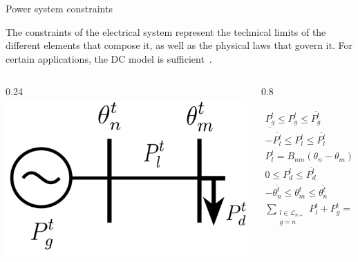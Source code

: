 \documentclass[hyperref={colorlinks,citecolor=blue,linkcolor=blue,urlcolor=blue}]{beamer}
\begin{document}
\begin{frame}{Power system constraints}

The constraints of the electrical system represent the technical limits of the different elements that compose it, as well as the physical laws that govern it. For certain applications, the DC model is sufficient~\cite{8468081}.

\begin{columns}
\begin{column}{0.24\textwidth}
\vspace{3pt}
    \includegraphics[width=1.4\textwidth]{figures/power_dummy_constraint.png}
\end{column}
\begin{column}{0.8\textwidth}  %


\begin{subequations}
\begin{alignat}{2}
    \underline{P_g^t} \leq P_{g}^t \leq \overline{P_g^t} &\quad &\forall \ g \in \mathcal{G}, \label{eq:gen_limits} \\
    -\overline{P_l^t} \leq P_{l}^t \leq \overline{P_l^t} &\quad &\forall \ l \in \mathcal{L}, \label{eq:line_limits} \\
    P_{l}^t = B_{nm}(\theta_n - \theta_{m}) &\quad &\forall \ l = (n, m) \in \mathcal{L}, \label{eq:dc_power_flow} \\
    0 \leq P_{d}^t \leq \overline{P_{d}^t} &\quad &\forall \ d \in \mathcal{D}, \label{eq:dem_limit_power} \\
    -\overline{\theta_{n}^t} \leq \theta_{m}^t \leq \overline{\theta_{n}^t} &\quad &\forall \ n \in \mathcal{N}_P, \label{eq:voltage_angle_limits} \\
    \sum_{\substack{l\in \mathcal{L}_{n+}\\g=n}}{P_{l}^t + P_{g}^t} = \sum_{\substack{l\in \mathcal{L}_{n-}\\d=n}} P_{l}^t + P_{d}^t &\quad &\forall \ n \in \mathcal{N}_P \label{eq:power_balance}
\end{alignat}
\end{subequations}
\end{column}
\end{columns}
\end{frame}
\end{document}
